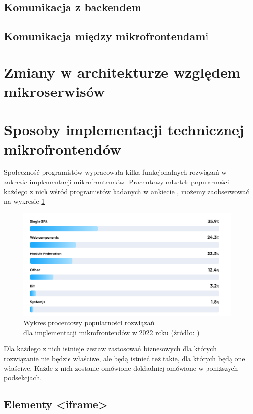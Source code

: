 \documentclass{SGGW-thesis}
\begin{document}
    \subsection{Komunikacja z backendem}
    \subsection{Komunikacja między mikrofrontendami}
  \section{Zmiany w architekturze względem mikroserwisów}
  \section{Sposoby implementacji technicznej mikrofrontendów}
  Społeczność programistów wypracowała kilka funkcjonalnych rozwiązań w zakresie implementacji mikrofrontendów. Procentowy odsetek popularności każdego z nich wśród programistów badanych w ankiecie \cite{tsh_2022}, możemy zaobserwować na wykresie \ref{fig:tsh_frontend_implementations}
  
  \begin{figure}[h]
    \centering
    \captionsetup{justification=centering}
    \includegraphics[width=\textwidth]{frontend_implementations_by_percent.png}
    \caption{Wykres procentowy popularności rozwiązań \\ dla implementacji mikrofrontendów w 2022 roku (źródło: \cite{tsh_2022})}
    \label{fig:tsh_frontend_implementations}
  \end{figure}

  Dla każdego z nich istnieje zestaw zastosowań biznesowych dla których rozwiązanie nie będzie właściwe, ale będą istnieć też takie, dla których będą one właściwe. Każde z nich zostanie omówione dokładniej omówione w poniższych podsekcjach. 
    \subsection{Elementy <iframe>}
\end{document}
